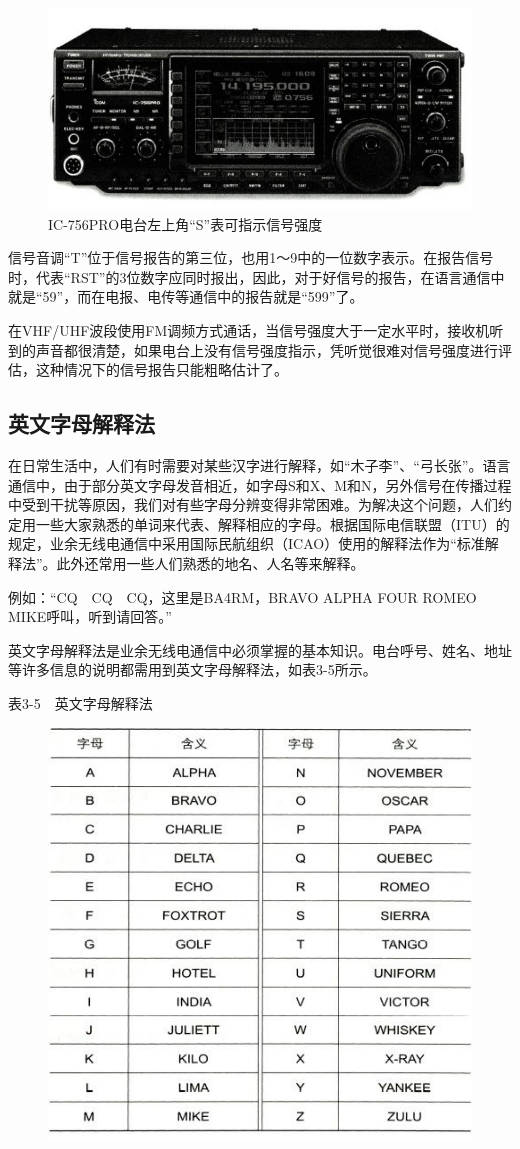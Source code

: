 \documentclass[12pt,UTF8]{ctexbook}
\begin{document}
\begin{figure}[htbp]
	\centering
	\includegraphics[width=0.7\linewidth]{35}
	\caption{IC-756PRO电台左上角“S”表可指示信号强度}
	\label{fig:1}
\end{figure}

信号音调“T”位于信号报告的第三位，也用1～9中的一位数字表示。在报告信号时，代表“RST”的3位数字应同时报出，因此，对于好信号的报告，在语言通信中就是“59”，而在电报、电传等通信中的报告就是“599”了。

在VHF/UHF波段使用FM调频方式通话，当信号强度大于一定水平时，接收机听到的声音都很清楚，如果电台上没有信号强度指示，凭听觉很难对信号强度进行评估，这种情况下的信号报告只能粗略估计了。

\subsection{英文字母解释法}

在日常生活中，人们有时需要对某些汉字进行解释，如“木子李”、“弓长张”。语言通信中，由于部分英文字母发音相近，如字母S和X、M和N，另外信号在传播过程中受到干扰等原因，我们对有些字母分辨变得非常困难。为解决这个问题，人们约定用一些大家熟悉的单词来代表、解释相应的字母。根据国际电信联盟（ITU）的规定，业余无线电通信中采用国际民航组织（ICAO）使用的解释法作为“标准解释法”。此外还常用一些人们熟悉的地名、人名等来解释。

例如：“CQ　CQ　CQ，这里是BA4RM，BRAVO ALPHA FOUR ROMEO MIKE呼叫，听到请回答。”

英文字母解释法是业余无线电通信中必须掌握的基本知识。电台呼号、姓名、地址等许多信息的说明都需用到英文字母解释法，如表3-5所示。

表3-5　英文字母解释法

\begin{figure}[htbp]
	\centering
	\includegraphics[width=0.7\linewidth]{36}
	\caption{}
	\label{fig:1}
\end{figure}
\end{document}
